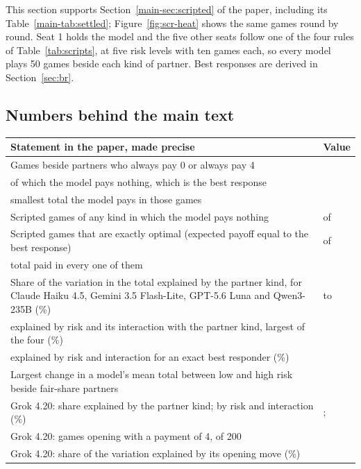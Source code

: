 \documentclass[10pt]{article}
\makeatletter
\let\plainsubsection\subsection
\renewcommand{\subsection}{\FloatBarrier\needspace{8\baselineskip}\plainsubsection}
\newenvironment{claims}{\small\begin{tabular}{@{}>{\raggedright\arraybackslash}p{0.74\textwidth}>{\raggedleft\arraybackslash}p{0.2\textwidth}@{}}\toprule Statement in the paper, made precise & Value \\\midrule}{\bottomrule\end{tabular}}
\makeatother
\begin{document}
This section supports Section~\ref{main-sec:scripted} of the paper, including its Table~\ref{main-tab:settled}; Figure~\ref{fig:scr-heat} shows the same games round by round. Seat 1 holds the model and the five other seats follow one of the four rules of Table~\ref{tab:scripts}, at five risk levels with ten games each, so every model plays 50 games beside each kind of partner. Best responses are derived in Section~\ref{sec:br}.

\subsection{Numbers behind the main text}

\begin{center}
\begin{claims}
Games beside partners who always pay 0 or always pay 4 & \ScrDominatedGames{} \\
\quad of which the model pays nothing, which is the best response & \ScrBestResponseDominated{} \\
\quad smallest total the model pays in those games & \ScrMinTotalDominated{} \\
Scripted games of any kind in which the model pays nothing & \SupScrGamesTotalZero{} of \ScrGames{} \\
Scripted games that are exactly optimal (expected payoff equal to the best response) & \ScrOptimalGames{} of \ScrGames{} \\
\quad total paid in every one of them & 20 \\
Share of the variation in the total explained by the partner kind, for Claude Haiku 4.5, Gemini 3.5 Flash-Lite, GPT-5.6 Luna and Qwen3-235B (\%) & \ScrOpponentShareMin{} to \ScrOpponentShareMax{} \\
\quad explained by risk and its interaction with the partner kind, largest of the four (\%) & \ScrRiskShareMax{} \\
\quad explained by risk and interaction for an exact best responder (\%) & \ScrBestResponderRiskShare{} \\
Largest change in a model's mean total between low and high risk beside fair-share partners & \SupScrFairChangeMax{} \\
Grok 4.20: share explained by the partner kind; by risk and interaction (\%) & \ScrGrokOpponentShare{}; \ScrGrokRiskShare{} \\
Grok 4.20: games opening with a payment of 4, of 200 & \ScrGrokOpenFour{} \\
Grok 4.20: share of the variation explained by its opening move (\%) & \ScrGrokFirstMoveShare{} \\

\end{claims}
\end{center}
\end{document}
